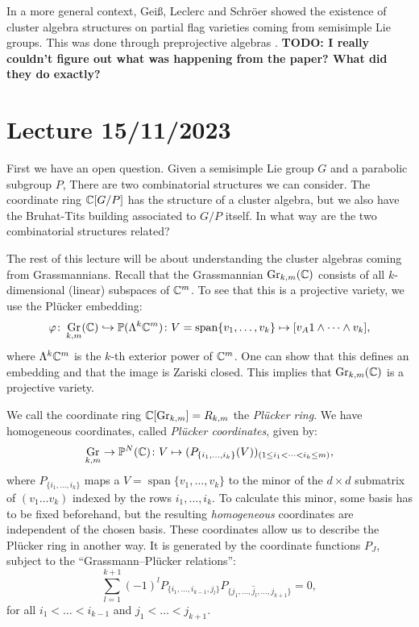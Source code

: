 \documentclass{article}
\DeclareMathOperator{\Gr}{Gr}
\DeclareMathOperator{\vect}{span}
\begin{document}
In a more general context, Gei{\ss}, Leclerc and Schr\"oer showed the existence of
cluster algebra structures on partial flag varieties coming from semisimple Lie groups.
This was done through preprojective algebras \cite{GeissLeclercSchroer2008PFvar}.
\textbf{TODO: I really couldn't figure out what was happening from the paper? What did
	they do exactly?}

\section{Lecture 15/11/2023}

First we have an open question. Given a semisimple Lie group $G$ and a parabolic
subgroup $P$, There are two combinatorial structures we can consider. The coordinate
ring $\mathbb{C}[G/P]$ has the structure of a cluster algebra, but we also have the
Bruhat-Tits building associated to $G/P$ itself. In what way are the two combinatorial
structures related?

The rest of this lecture will be about understanding the cluster algebras coming from
Grassmannians. Recall that the Grassmannian $\Gr_{k, m}(\bbC)$ consists of all
$k$-dimensional (linear) subspaces of $\mathbb{C}^m$. To see that this is a projective
variety, we use the Plücker embedding:
\begin{equation*}
	\varphi \colon \Gr_{k,m}(\bbC) \injto \bbP(\Lambda^k \bbC^m) \colon
	V = \vect\{v_1, \dots, v_k\} \mapsto [v_A1 \wedge \dots \wedge v_k],
\end{equation*}
where $\Lambda^k \mathbb{C}^m$ is the $k$-th exterior power of $\mathbb{C}^m$. One can
show that this defines an embedding and that the image is Zariski closed.
This implies that $\Gr_{k, m}(\bbC)$ is a projective variety.

We call the coordinate ring $\bbC[\Gr_{k, m}] = R_{k,m}$ the \emph{Plücker ring}. We
have homogeneous coordinates, called \emph{Plücker coordinates}, given by:
\begin{equation*}
	\Gr_{k, m} \to \bbP^N(\bbC) \colon
	V \mapsto (P_{\{i_1, \dots, i_k\}}(V))_{(1 \leq i_1 < \dots < i_k \leq m)},
\end{equation*}
where $P_{\{i_1, \dots, i_k\}}$ maps a $V = \vect\{v_1 , \dots, v_k\}$ to the minor
of the $d\times d$ submatrix of $(v_1 \dots v_k)$ indexed by the rows $i_1, \dots, i_k$.
To calculate this minor, some basis has to be fixed beforehand, but the resulting
\emph{homogeneous} coordinates are independent of the chosen basis.
These coordinates allow us to describe the Plücker ring in another way.
It is generated by the coordinate functions $P_J$, subject to the ``Grassmann--Plücker relations'':
\begin{equation*}
	\sum_{l = 1}^{k + 1} (-1)^l P_{\{i_1, \dots, i_{k - 1}, j_l\}}P_{\{j_1, \dots, \hat{j}_l, \dots, j_{k+1}\}} = 0,
\end{equation*}
for all $i_1 < \dots < i_{k-1}$ and $j_1 < \dots < j_{k+1}$.
\end{document}
